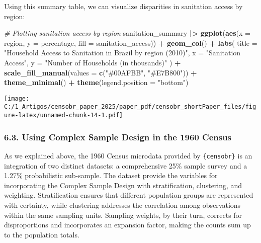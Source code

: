 \documentclass[
]{article}
\newenvironment{Shaded}{\begin{snugshade}}{\end{snugshade}}
\newcommand{\AttributeTok}[1]{\textcolor[rgb]{0.13,0.29,0.53}{#1}}
\newcommand{\CommentTok}[1]{\textcolor[rgb]{0.56,0.35,0.01}{\textit{#1}}}
\newcommand{\FunctionTok}[1]{\textcolor[rgb]{0.13,0.29,0.53}{\textbf{#1}}}
\newcommand{\NormalTok}[1]{#1}
\newcommand{\SpecialCharTok}[1]{\textcolor[rgb]{0.81,0.36,0.00}{\textbf{#1}}}
\newcommand{\StringTok}[1]{\textcolor[rgb]{0.31,0.60,0.02}{#1}}
\begin{document}
Using this summary table, we can visualize disparities in sanitation
access by region:

\begin{Shaded}
\begin{Highlighting}[]
\CommentTok{\# Plotting sanitation access by region}
\NormalTok{sanitation\_summary }\SpecialCharTok{|\textgreater{}}
  \FunctionTok{ggplot}\NormalTok{(}\FunctionTok{aes}\NormalTok{(}\AttributeTok{x =}\NormalTok{ region, }\AttributeTok{y =}\NormalTok{ percentage, }\AttributeTok{fill =}\NormalTok{ sanitation\_access)) }\SpecialCharTok{+}
  \FunctionTok{geom\_col}\NormalTok{() }\SpecialCharTok{+}
  \FunctionTok{labs}\NormalTok{(}
    \AttributeTok{title =} \StringTok{"Household Access to Sanitation in Brazil by region (2010)"}\NormalTok{,}
    \AttributeTok{x =} \StringTok{"Sanitation Access"}\NormalTok{,}
    \AttributeTok{y =} \StringTok{"Number of Households (in thousands)"}
\NormalTok{  ) }\SpecialCharTok{+}
  \FunctionTok{scale\_fill\_manual}\NormalTok{(}\AttributeTok{values =} \FunctionTok{c}\NormalTok{(}\StringTok{"\#00AFBB"}\NormalTok{, }\StringTok{"\#E7B800"}\NormalTok{)) }\SpecialCharTok{+}
  \FunctionTok{theme\_minimal}\NormalTok{() }\SpecialCharTok{+}
        \FunctionTok{theme}\NormalTok{(}\AttributeTok{legend.position =} \StringTok{"bottom"}\NormalTok{)}
\end{Highlighting}
\end{Shaded}

\texttt{[image: C:/1\_Artigos/censobr\_paper\_2025/paper\_pdf/censobr\_shortPaper\_files/figure-latex/unnamed-chunk-14-1.pdf]}

\subsubsection{6.3. Using Complex Sample Design in the 1960
Census}\label{using-complex-sample-design-in-the-1960-census}

As we explained above, the 1960 Census microdata provided by
\texttt{\{censobr\}} is an integration of two distinct datasets: a
comprehensive 25\% sample survey and a 1.27\% probabilistic sub-sample.
The dataset provide the variables for incorporating the Complex Sample
Design with stratification, clustering, and weighting. Stratification
ensures that different population groups are represented with certainty,
while clustering addresses the correlation among observations within the
same sampling units. Sampling weights, by their turn, corrects for
disproportions and incorporates an expansion factor, making the counts
sum up to the population totals.
\end{document}
